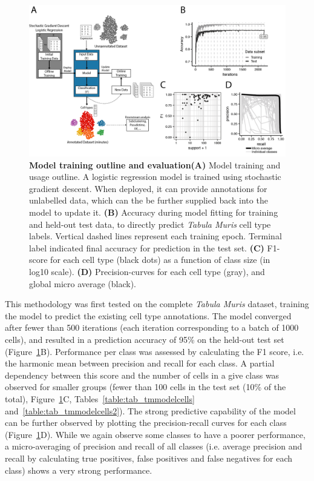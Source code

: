 \begin{figure}[ht!]
    \centering
    \includegraphics[width=1.0\textwidth]{Chapter3/Figs/chap3_model.png} %
    \caption[Model training outline and evaluation]{\textbf{Model training outline and evaluation}\newline\textbf{(A)} Model training and usage outline. A logistic regression model is trained using stochastic gradient descent. When deployed, it can provide annotations for unlabelled data, which can the be further supplied back into the model to update it. \textbf{(B)} Accuracy during model fitting for training and held-out test data, to directly predict \textit{Tabula Muris} cell type labels. Vertical dashed lines represent each training epoch. Terminal label indicated final accuracy for prediction in the test set. \textbf{(C)} F1-score for each cell type (black dots) as a function of class size (in log10 scale). \textbf{(D)} Precision-curves for each cell type (gray), and global micro average (black).}
    \label{fig:chap3_model}
\end{figure}

This methodology was first tested on the complete \textit{Tabula Muris} dataset, training the model to predict the existing cell type annotations. The model converged after fewer than 500 iterations (each iteration corresponding to a batch of 1000 cells), and resulted in a prediction accuracy of 95\% on the held-out test set (Figure~\ref{fig:chap3_model}B). Performance per class was assessed by calculating the F1 score, i.e. the harmonic mean between precision and recall for each class. A partial dependency between this score and the number of cells in a give class was observed for smaller groups (fewer than 100 cells in the test set (10\% of the total), Figure~\ref{fig:chap3_model}C, Tables~\ref{table:tab_tmmodelcells} and~\ref{table:tab_tmmodelcells2}). The strong predictive capability of the model can be further observed by plotting the precision-recall curves for each class (Figure~\ref{fig:chap3_model}D). While we again observe some classes to have a poorer performance, a micro-averaging of precision and recall of all classes (i.e. average precision and recall by calculating true positives, false positives and false negatives for each class) shows a very strong performance.

